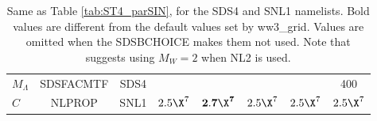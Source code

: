 \begin{landscape}
\begin{table}
\begin{center}
\begin{tabular}{|l|c|c|c|c|c|c|c|}
  $ M_\Lambda$			   & SDSFACMTF	   & SDS4      &            &                   &              &             & 400 \\
  $C$                              & NLPROP        & SNL1      & $2.5\X^7$   &$\mathbf{2.7\X^7}$& $2.5\X^7$    & $2.5\X^7$   & $2.5\X^7$ \\
 \hline \hline
\end{tabular}  
\end{center}

\caption{Same as Table \ref{tab:ST4_parSIN}, for the {\F SDS4} and {\F SNL1}
namelists. Bold values are different from the default values set by 
 ww3\_grid. Values are omitted when the SDSBCHOICE makes them not used. Note that \cite{Romero2019} suggests using  $ M_W=2$ when NL2 is used.	 } \label{tab:ST4_parSDS}
\end{table}
\end{landscape}
